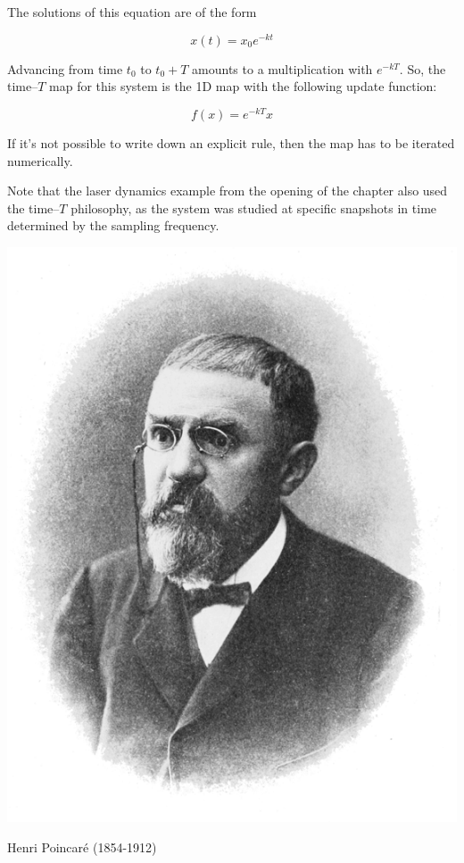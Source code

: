 The solutions of this equation are of the form

\begin{equation}
x(t) = x_0 e^{-kt}
\end{equation} 

Advancing from time $t_0$ to $t_0+T$ amounts to a multiplication with $e^{-kT}$. So, the time--$T$ map for this system is the 1D map with the following update function:

\begin{equation}
f(x) = e^{-kT} x
\end{equation} 

If it's not possible to write down an explicit rule, then the map has to be iterated numerically.

Note that the laser dynamics example from the opening of the chapter also used the time--$T$ philosophy, as the system was studied at specific snapshots in time determined by the sampling frequency.

\begin{marginfigure}[-8.0cm]
  \includegraphics{dynamic/figures/poincare_photo}
  \caption{Henri Poincaré (1854-1912)}
\end{marginfigure}

